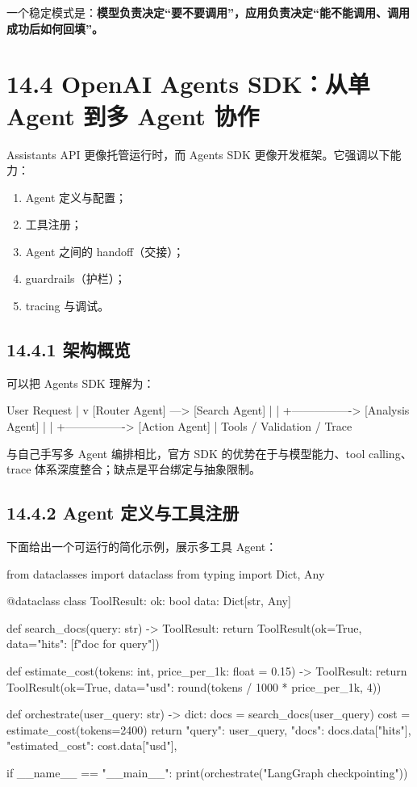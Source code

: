一个稳定模式是：\textbf{模型负责决定“要不要调用”，应用负责决定“能不能调用、调用成功后如何回填”。}


\section{14.4 OpenAI Agents SDK：从单 Agent 到多 Agent 协作}

Assistants API 更像托管运行时，而 Agents SDK 更像开发框架。它强调以下能力：


\begin{enumerate}[leftmargin=2em]
\item Agent 定义与配置；
\item 工具注册；
\item Agent 之间的 handoff（交接）；
\item guardrails（护栏）；
\item tracing 与调试。
\end{enumerate}

\subsection{14.4.1 架构概览}

可以把 Agents SDK 理解为：


\begin{codeblock}
User Request
    |
    v
[Router Agent] ---> [Search Agent]
    |                    |
    +----------------> [Analysis Agent]
    |                    |
    +----------------> [Action Agent]
                         |
                     Tools / Validation / Trace
\end{codeblock}

与自己手写多 Agent 编排相比，官方 SDK 的优势在于与模型能力、tool calling、trace 体系深度整合；缺点是平台绑定与抽象限制。


\subsection{14.4.2 Agent 定义与工具注册}

下面给出一个可运行的简化示例，展示多工具 Agent：


\begin{codeblock}
from dataclasses import dataclass
from typing import Dict, Any

@dataclass
class ToolResult:
    ok: bool
    data: Dict[str, Any]

def search_docs(query: str) -> ToolResult:
    return ToolResult(ok=True, data={"hits": [f"doc for {query}"]})

def estimate_cost(tokens: int, price_per_1k: float = 0.15) -> ToolResult:
    return ToolResult(ok=True, data={"usd": round(tokens / 1000 * price_per_1k, 4)})

def orchestrate(user_query: str) -> dict:
    docs = search_docs(user_query)
    cost = estimate_cost(tokens=2400)
    return {
        "query": user_query,
        "docs": docs.data["hits"],
        "estimated_cost": cost.data["usd"],
    }

if __name__ == "__main__":
    print(orchestrate("LangGraph checkpointing"))
\end{codeblock}

